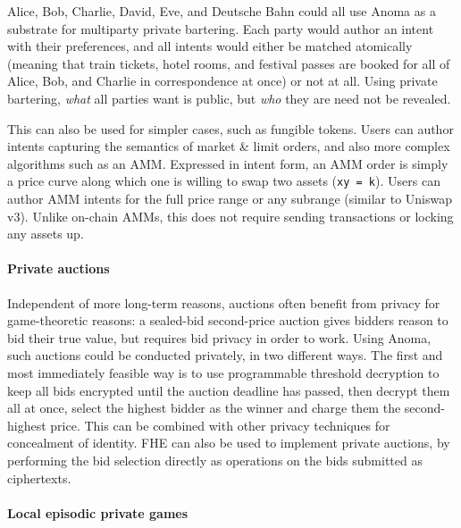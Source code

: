\documentclass[
    9pt,            %
    commun,        %
    affiltop,       %
]{art}
\begin{document}
Alice, Bob, Charlie, David, Eve, and Deutsche Bahn could all use Anoma
as a substrate for multiparty private bartering. Each party would author
an intent with their preferences, and all intents would either be
matched atomically (meaning that train tickets, hotel rooms, and
festival passes are booked for all of Alice, Bob, and Charlie in
correspondence at once) or not at all. Using private bartering,
\emph{what} all parties want is public, but \emph{who} they are need not
be revealed.

This can also be used for simpler cases, such as fungible tokens. Users
can author intents capturing the semantics of market \& limit orders,
and also more complex algorithms such as an AMM. Expressed in intent
form, an AMM order is simply a price curve along which one is willing to
swap two assets (\texttt{xy\ =\ k}). Users can author AMM intents for
the full price range or any subrange (similar to Uniswap v3). Unlike
on-chain AMMs, this does not require sending transactions or locking any
assets up.

\paragraph{Private auctions}\label{private-auctions}

Independent of more long-term reasons, auctions often benefit from
privacy for game-theoretic reasons: a sealed-bid second-price auction
gives bidders reason to bid their true value, but requires bid privacy
in order to work. Using Anoma, such auctions could be conducted
privately, in two different ways. The first and most immediately
feasible way is to use programmable threshold decryption to keep all
bids encrypted until the auction deadline has passed, then decrypt them
all at once, select the highest bidder as the winner and charge them the
second-highest price. This can be combined with other privacy techniques
for concealment of identity. FHE can also be used to implement private
auctions, by performing the bid selection directly as operations on the
bids submitted as ciphertexts.

\paragraph{Local episodic private
games}\label{local-episodic-private-games}
\end{document}
